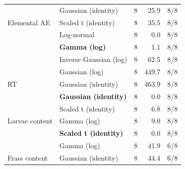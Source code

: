 \begin{table}[H]
{\begin{tabular}[t]{llrrr}
\cmidrule{2-5}
 & Gaussian (identity) & 8 & 25.9 & 8/8\\
\cmidrule{2-5}
\multirow{-3}{*}{\raggedright\arraybackslash Elemental AE} & Scaled t (identity) & 8 & 35.5 & 8/8\\
\cmidrule{1-5}
 & Log-normal & 8 & 0.0 & 8/8\\
\cmidrule{2-5}
 & \textbf{Gamma (log)} & 8 & 1.1 & 8/8\\
\cmidrule{2-5}
 & Inverse Gaussian (log) & 8 & 62.5 & 8/8\\
\cmidrule{2-5}
 & Gaussian (log) & 8 & 449.7 & 8/8\\
\cmidrule{2-5}
\multirow{-5}{*}{\raggedright\arraybackslash RT} & Gaussian (identity) & 8 & 463.9 & 8/8\\
\cmidrule{1-5}
 & \textbf{Gaussian (identity)} & 8 & 0.0 & 8/8\\
\cmidrule{2-5}
 & Scaled t (identity) & 8 & 6.8 & 8/8\\
\cmidrule{2-5}
\multirow{-3}{*}{\raggedright\arraybackslash Larvae content} & Gamma (log) & 8 & 9.0 & 8/8\\
\cmidrule{1-5}
 & \textbf{Scaled t (identity)} & 8 & 0.0 & 8/8\\
\cmidrule{2-5}
 & Gamma (log) & 8 & 41.9 & 6/8\\
\cmidrule{2-5}
\multirow{-3}{*}{\raggedright\arraybackslash Frass content} & Gaussian (identity) & 8 & 44.4 & 6/8\\
\bottomrule
\end{tabular}}
\end{table}
